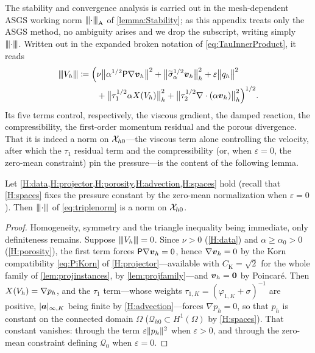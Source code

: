 The stability and convergence analysis is carried out in the mesh{\hyp}dependent ASGS working
norm ${\lvert\kern-0.25ex\lvert\kern-0.25ex\lvert \cdot \rvert\kern-0.25ex\rvert\kern-0.25ex\rvert}_{\mathrm{A}}$ of \cref{lemma:Stability}; as this appendix treats only
the ASGS method, no ambiguity arises and we drop the subscript, writing simply
${\lvert\kern-0.25ex\lvert\kern-0.25ex\lvert \cdot \rvert\kern-0.25ex\rvert\kern-0.25ex\rvert}$. Written out in the expanded broken notation of
\cref{eq:TauInnerProduct}, it reads
\begin{equation}\label{eq:triplenorm}
\begin{aligned}
  {\lvert\kern-0.25ex\lvert\kern-0.25ex\lvert V_h \rvert\kern-0.25ex\rvert\kern-0.25ex\rvert}
  \coloneqq \Bigl(
  &\nu\bigl\lVert\alpha^{1/2}\mathsf{P}\nabla\boldsymbol{v}_h\bigr\rVert^2
  + \bigl\lVert\widetilde{\sigma}_{\alpha}^{1/2}\boldsymbol{v}_h\bigr\rVert_h^2
  + \varepsilon\bigl\lVert q_h \bigr\rVert^2 \\
  &+ \bigl\lVert\tau_1^{1/2}\alpha X(V_h)\bigr\rVert_h^2
  + \bigl\lVert\tau_2^{1/2}\nabla\cdot(\alpha\boldsymbol{v}_h)\bigr\rVert_h^2
  \Bigr)^{1/2}.
\end{aligned}
\end{equation}
Its five terms control, respectively, the viscous gradient, the damped reaction, the
compressibility, the first{\hyp}order momentum residual and the porous divergence. That it is
indeed a norm on $\mathcal{X}_{h0}$---the viscous term alone controlling the velocity, after which the
$\tau_1$ residual term and the compressibility (or, when $\varepsilon=0$, the zero{\hyp}mean
constraint) pin the pressure---is the content of the following lemma.

\begin{lemma}\label{lem:definiteness}
Let \cref{H:data,H:projector,H:porosity,H:advection,H:spaces} hold (recall that
\cref{H:spaces} fixes the pressure constant by the zero{\hyp}mean normalization when
$\varepsilon = 0$). Then ${\lvert\kern-0.25ex\lvert\kern-0.25ex\lvert \cdot \rvert\kern-0.25ex\rvert\kern-0.25ex\rvert}$ of
\eqref{eq:triplenorm} is a norm on $\mathcal{X}_{h0}$.
\end{lemma}
\begin{proof}
Homogeneity, symmetry and the triangle inequality being immediate, only definiteness remains.
Suppose ${\lvert\kern-0.25ex\lvert\kern-0.25ex\lvert V_h \rvert\kern-0.25ex\rvert\kern-0.25ex\rvert}=0$. Since $\nu>0$ (\cref{H:data}) and $\alpha\ge\alpha_0>0$
(\cref{H:porosity}), the first term forces $\mathsf{P}\nabla\boldsymbol{v}_h=0$, hence $\nabla\boldsymbol{v}_h=0$ by the
Korn compatibility \cref{eq:PiKorn} of \cref{H:projector}---available with
$C_{\mathrm{K}}=\sqrt2$ for the whole family of \cref{lem:projinstances}, by
\cref{lem:projfamily}---and $\boldsymbol{v}_h=\boldsymbol 0$ by Poincar\'e. Then $X(V_h)=\nabla p_h$, and
the $\tau_1$ term---whose weights $\tau_{1,K}=(\varphi_{1,K}+\sigma)^{-1}$ are positive, $|\boldsymbol{a}|_{\infty,K}$ being finite by \cref{H:advection}---forces $\nabla p_h=0$, so that
$p_h$ is constant on the connected domain $\Omega$ ($\mathcal{Q}_{h0}\subset H^1(\Omega)$ by
\cref{H:spaces}). That constant vanishes: through the term $\varepsilon\lVert p_h\rVert^2$ when
$\varepsilon>0$, and through the zero{\hyp}mean constraint defining $\mathcal{Q}_0$ when
$\varepsilon=0$.
\end{proof}

